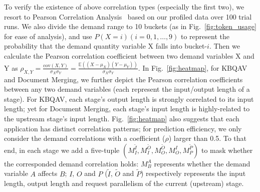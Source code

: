 To verify the existence of above correlation types (especially the first two), we resort to Pearson Correlation Analysis~\cite{sedgwick2012pearson} based on our profiled data over 100 trial runs.
We also divide the demand range to 10 buckets (as in Fig.~\ref{fig:token_usage} for ease of analysis), and use $P(X=i) (i=0,1,…,9)$ to represent the probability that the demand quantity variable X falls into bucket-$i$.
Then we calculate the Pearson correlation coefficient between two demand variables X and Y as
$\rho_{X,Y} = \frac{\text{cov}(X,Y)}{\sigma_X \sigma_Y} = \frac{\mathbb{E}((X - \mu_X)(Y - \mu_Y))}{\sigma_X \sigma_Y}.$	
In Fig.~\ref{fig:heatmap}, for KBQAV and Document Merging, we further depict the Pearson correlation coefficients between any two demand variables (each represent the input/output length of a stage).
For KBQAV, each stage's output length is strongly correlated to its input length; yet for Document Merging, each stage's input length is highly-related to the upstream stage's input length. 
Fig.~\ref{fig:heatmap} also suggests that each application has distinct correlation patterns; for prediction efficiency, we only consider the demand correlations with a coefficient ($\rho$) larger than 0.5.
To that end, in each stage we add a five-tuple $({M_I^\tilde{I}}, {M_I^\tilde{O}}, {M_O^\tilde{O}}, {M_O^I}, {M_P^\tilde{P}})$ to mask whether the corresponded demand correlation holds: $M_B^A$ represents whether the demand variable $A$ affects $B$; $I$, $O$ and $P$ ($\tilde{I}$, $\tilde{O}$ and $\tilde{P}$) respectively represents the input length, output length and request parallelism of the current (upstream) stage.

